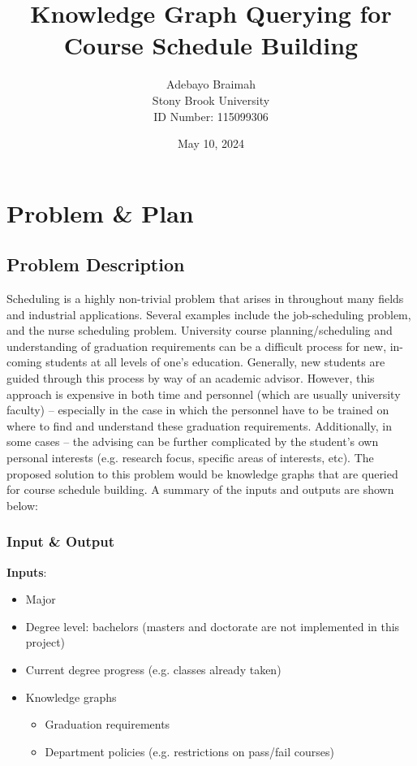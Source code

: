 \documentclass[12pt]{article}
\title{\Large \bf 
Knowledge Graph Querying for Course Schedule Building
}
\author{
{\rm Adebayo Braimah}\\
Stony Brook University \\
{\rm ID Number: 115099306}
}
\date{May 10, 2024}
\begin{document}
    
    \maketitle
        
    \section{Problem \& Plan}
    \label{sec:prob_plan}
    
    \subsection{Problem Description}
    \label{subsec:problem}
    Scheduling is a highly non-trivial problem that arises in throughout many fields and industrial applications. Several examples include the job-scheduling problem\cite{scheduling1972}, and the nurse scheduling problem\cite{nurse2017}.
    University course planning/scheduling and understanding of graduation requirements can be a difficult process for new, in-coming students at all levels of one's education\cite{lunch2023}. Generally, new students are guided through this process by way of an academic advisor. However, this approach is expensive in both time and personnel (which are usually university faculty) -- especially in the case in which the personnel have to be trained on where to find and understand these graduation requirements. Additionally, in some cases -- the advising can be further complicated by the student's own personal interests (e.g. research focus, specific areas of interests, etc). The proposed solution to this problem would be knowledge graphs that are queried for course schedule building. A summary of the inputs and outputs are shown below:

    \subsubsection{Input \& Output}
    \label{subsubsec:in-out}
    
    \textbf{Inputs}:

    \begin{itemize}
        \label{items:inputs}
        \item Major
        \item Degree level: bachelors (masters and doctorate are not implemented in this project)
        \item Current degree progress (e.g. classes already taken)
        \item Knowledge graphs
        \begin{itemize}
            \item Graduation requirements
            \item Department policies (e.g. restrictions on pass/fail courses)
        \end{itemize}
    \end{itemize}
\end{document}
